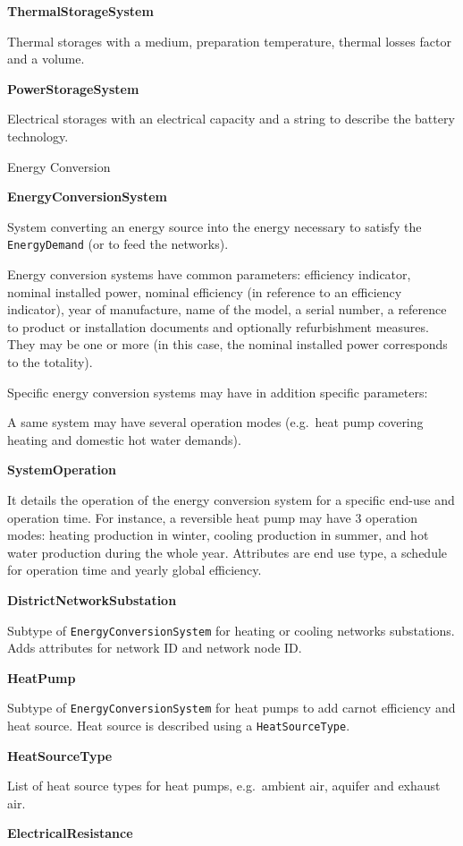 \documentclass[a4paper,12pt]{article}
\begin{document}
\textbf{ThermalStorageSystem}

Thermal storages with a medium, preparation temperature, thermal losses
factor and a volume.

\textbf{PowerStorageSystem}

Electrical storages with an electrical capacity and a string to describe
the battery technology.

Energy Conversion

\textbf{EnergyConversionSystem}

System converting an energy source into the energy necessary to satisfy
the \texttt{EnergyDemand} (or to feed the networks).

Energy conversion systems have common parameters: efficiency indicator,
nominal installed power, nominal efficiency (in reference to an
efficiency indicator), year of manufacture, name of the model, a serial
number, a reference to product or installation documents and optionally
refurbishment measures. They may be one or more (in this case, the
nominal installed power corresponds to the totality).

Specific energy conversion systems may have in addition specific
parameters:

A same system may have several operation modes (e.g.~heat pump covering
heating and domestic hot water demands).

\textbf{SystemOperation}

It details the operation of the energy conversion system for a specific
end-use and operation time. For instance, a reversible heat pump may
have 3 operation modes: heating production in winter, cooling production
in summer, and hot water production during the whole year. Attributes
are end use type, a schedule for operation time and yearly global
efficiency.

\textbf{DistrictNetworkSubstation}

Subtype of \texttt{EnergyConversionSystem} for heating or cooling
networks substations. Adds attributes for network ID and network node
ID.

\textbf{HeatPump}

Subtype of \texttt{EnergyConversionSystem} for heat pumps to add carnot
efficiency and heat source. Heat source is described using a
\texttt{HeatSourceType}.

\textbf{HeatSourceType}

List of heat source types for heat pumps, e.g.~ambient air, aquifer and
exhaust air.

\textbf{ElectricalResistance}
\end{document}

